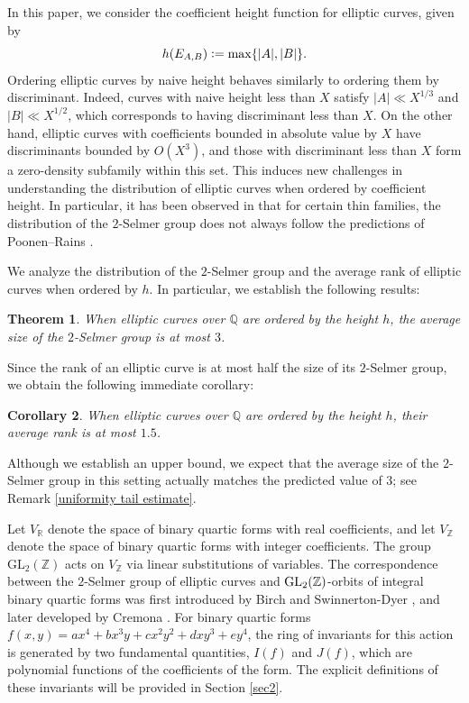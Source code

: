 \documentclass{article}
\def\GL{{\rm GL}}
\newtheorem{theorem}{Theorem}[section]
\newtheorem{cor}[theorem]{Corollary}
\begin{document}
In this paper, we consider the coefficient height function for elliptic curves, given by  
\begin{equation*}
h(E_{A,B}) \vcentcolon= \max\{|A|, |B|\}.
\end{equation*}  
Ordering elliptic curves by naive height behaves similarly to ordering them by discriminant. Indeed, curves with naive height less than $X$ satisfy $|A| \ll X^{1/3}$ and $|B| \ll X^{1/2}$, which corresponds to having discriminant less than $X$. On the other hand, elliptic curves with coefficients bounded in absolute value by $X$ have discriminants bounded by $O(X^3)$, and those with discriminant less than $X$ form a zero-density subfamily within this set. This induces new challenges in understanding the distribution of elliptic curves when ordered by coefficient height. In particular, it has been observed in \cite{thin} that for certain thin families, the distribution of the $2$-Selmer group does not always follow the predictions of Poonen--Rains \cite{PoonenRains}. 

We analyze the distribution of the $2$-Selmer group and the average rank of elliptic curves when ordered by $h$. In particular, we establish the following results:

\begin{theorem}\label{2-Selmer average}
    When elliptic curves over $\mathbb{Q}$ are ordered by the height $h$, the average size of the $2$-Selmer group is at most $3$.
\end{theorem}

Since the rank of an elliptic curve is at most half the size of its $2$-Selmer group, we obtain the following immediate corollary:

\begin{cor}
    When elliptic curves over $\mathbb{Q}$ are ordered by the height $h$, their average rank is at most $1.5$.
\end{cor}

Although we establish an upper bound, we expect that the average size of the $2$-Selmer group in this setting actually matches the predicted value of $3$; see Remark \ref{uniformity tail estimate}. 

Let $V_{\mathbb{R}}$ denote the space of binary quartic forms with real coefficients, and let $V_{\mathbb{Z}}$ denote the space of binary quartic forms with integer coefficients. The group $\mathrm{GL}_2(\mathbb{Z})$ acts on $V_{\mathbb{Z}}$ via linear substitutions of variables. The correspondence between the $2$-Selmer group of elliptic curves and $\GL_2(\mathbb{Z})$-orbits of integral binary quartic forms was first introduced by Birch and Swinnerton-Dyer \cite{birch1963notes}, and later developed by Cremona \cite{cremona2008algorithms}. For binary quartic forms $f(x, y) = ax^4 + bx^3y + cx^2y^2 + dxy^3 + ey^4$, the ring of invariants for this action is generated by two fundamental quantities, $I(f)$ and $J(f)$, which are polynomial functions of the coefficients of the form. The explicit definitions of these invariants will be provided in Section \ref{sec2}.
\end{document}

